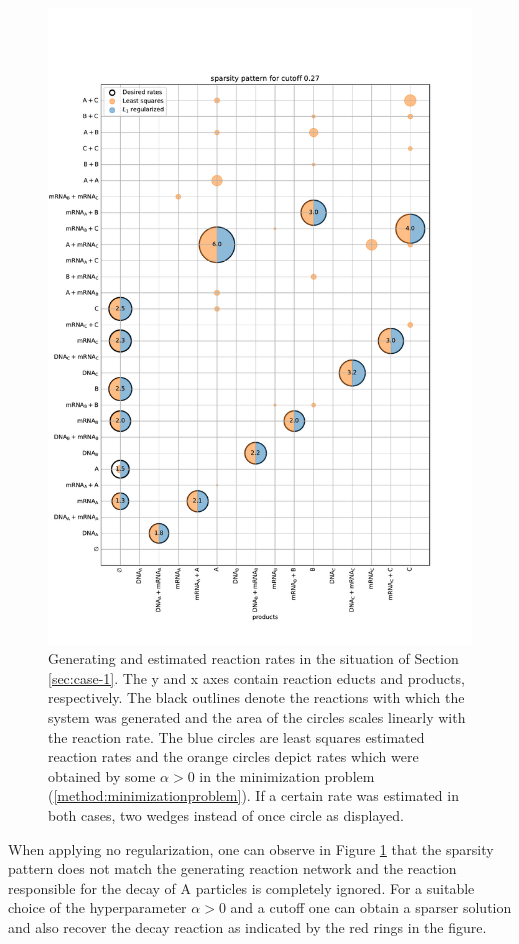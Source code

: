 \documentclass[oneside, abstracton, titlepage]{scrartcl}
\begin{document}
	\begin{figure}
		\centering
		\includegraphics[width=.9\textwidth]{./figures_tex/bubbles}
		\caption{Generating and estimated reaction rates in the situation of Section \ref{sec:case-1}. The y and x axes contain reaction educts and products, respectively. The black outlines denote the reactions with which the system was generated and the area of the circles scales linearly with the reaction rate. The blue circles are least squares estimated reaction rates and the orange circles depict rates which were obtained by some $\alpha>0$ in the minimization problem (\ref{method:minimizationproblem}). If a certain rate was estimated in both cases, two wedges instead of once circle as displayed.}
		\label{fig:case-1-sparsity-pattern}
	\end{figure}

	When applying no regularization, one can observe in Figure \ref{fig:case-1-sparsity-pattern} that the sparsity pattern does not match the generating reaction network and the reaction responsible for the decay of $\mathrm{A}$ particles is completely ignored. For a suitable choice of the hyperparameter $\alpha > 0$ and a cutoff one can obtain a sparser solution and also recover the decay reaction as indicated by the red rings in the figure.
	
\end{document}
